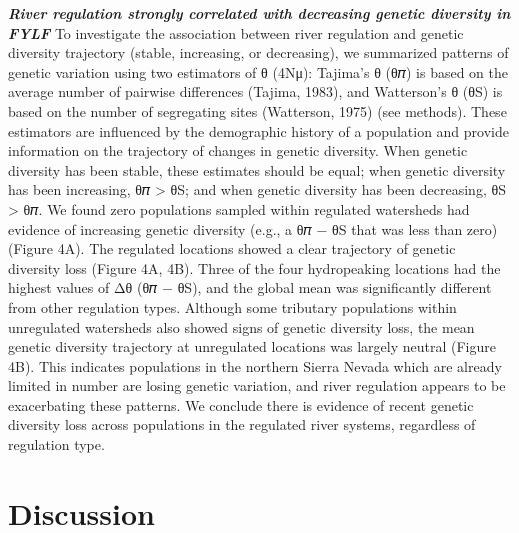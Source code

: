 \documentclass[twoside,12pt,final]{ucthesis-CA2012}
\begin{document}
\begin{ucmainmatter}
\textbf{\emph{River regulation strongly correlated with decreasing
genetic diversity in FYLF}} To investigate the association between river
regulation and genetic diversity trajectory (stable, increasing, or
decreasing), we summarized patterns of genetic variation using two
estimators of θ (4Nμ): Tajima's θ (θ𝜋) is based on the average number of
pairwise differences (Tajima, 1983), and Watterson's θ (θS) is based on
the number of segregating sites (Watterson, 1975) (see methods). These
estimators are influenced by the demographic history of a population and
provide information on the trajectory of changes in genetic diversity.
When genetic diversity has been stable, these estimates should be equal;
when genetic diversity has been increasing, θ𝜋 \textgreater{} θS; and
when genetic diversity has been decreasing, θS \textgreater{} θ𝜋. We
found zero populations sampled within regulated watersheds had evidence
of increasing genetic diversity (e.g., a θ𝜋 − θS that was less than
zero) (Figure 4A). The regulated locations showed a clear trajectory of
genetic diversity loss (Figure 4A, 4B). Three of the four hydropeaking
locations had the highest values of Δθ (θ𝜋 − θS), and the global mean
was significantly different from other regulation types. Although some
tributary populations within unregulated watersheds also showed signs of
genetic diversity loss, the mean genetic diversity trajectory at
unregulated locations was largely neutral (Figure 4B). This indicates
populations in the northern Sierra Nevada which are already limited in
number are losing genetic variation, and river regulation appears to be
exacerbating these patterns. We conclude there is evidence of recent
genetic diversity loss across populations in the regulated river
systems, regardless of regulation type.

\hypertarget{discussion}{%
\section{Discussion}\label{discussion}}


\end{ucmainmatter}
\end{document}
